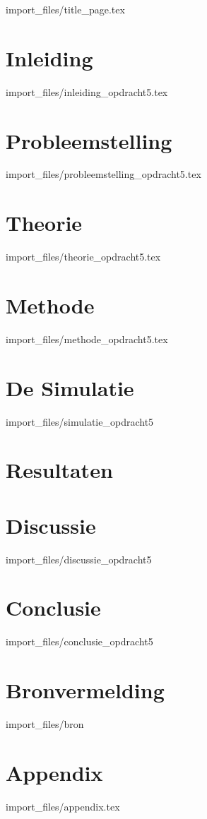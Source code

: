 \documentclass{article}
\begin{document}
{import_files/title_page.tex}

\tableofcontents
\clearpage

\section{Inleiding}

{import_files/inleiding_opdracht5.tex}

\section{Probleemstelling}

{import_files/probleemstelling_opdracht5.tex}

\section{Theorie}

{import_files/theorie_opdracht5.tex}

\section{Methode}

{import_files/methode_opdracht5.tex}

\section{De Simulatie}
 
{import_files/simulatie_opdracht5}

\section{Resultaten}


\section{Discussie}

{import_files/discussie_opdracht5}

\section{Conclusie}

{import_files/conclusie_opdracht5}

\section{Bronvermelding}

{import_files/bron}

\section{Appendix}

{import_files/appendix.tex}
\end{document}
